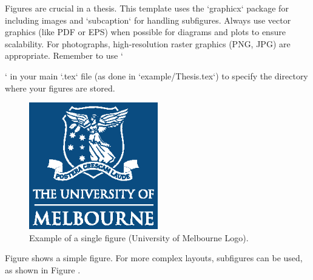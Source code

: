 Figures are crucial in a thesis. This template uses the `graphicx` package for including images and `subcaption` for handling subfigures.
Always use vector graphics (like PDF or EPS) when possible for diagrams and plots to ensure scalability. For photographs, high-resolution raster graphics (PNG, JPG) are appropriate.
Remember to use `\graphicspath{{Figures/}}` in your main `.tex` file (as done in `example/Thesis.tex`) to specify the directory where your figures are stored.

\begin{figure}[htbp]
    \centering
    \includegraphics[width=0.5\textwidth]{unimelb_logo.eps} %
    \caption{Example of a single figure (University of Melbourne Logo).}
    \label{fig:unimelb_logo_example}
\end{figure}

Figure  shows a simple figure. For more complex layouts, subfigures can be used, as shown in Figure .

